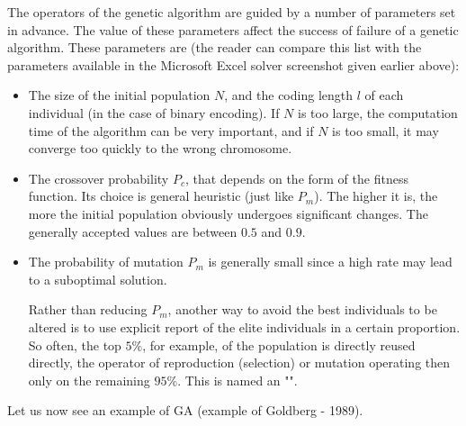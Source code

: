 	The operators of the genetic algorithm are guided by a number of parameters set in advance. The value of these parameters affect the success of failure of a genetic algorithm. These parameters are (the reader can compare this list with the parameters available in the Microsoft Excel solver screenshot given earlier above):
	\begin{itemize}
		\item The size of the initial population $N$, and the coding length $l$ of each individual (in the case of binary encoding). If $N$ is too large, the computation time of the algorithm can be very important, and if $N$ is too small, it may converge too quickly to the wrong chromosome.

		\item The crossover probability $P_c$, that depends on the form of the fitness function. Its choice is general heuristic (just like $P_m$). The higher it is, the more the initial population obviously undergoes significant changes. The generally accepted values are between $0.5$ and $0.9$.

		\item The probability of mutation $P_m$ is generally small since a high rate may lead to a suboptimal solution.
		
		Rather than reducing $P_m$, another way to avoid the best individuals to be altered is to use explicit report of the elite individuals in a certain proportion. So often, the top $5\%$, for example, of the population is directly reused directly, the operator of reproduction (selection) or mutation operating then only on the remaining $95\%$. This is named an "".
	\end{itemize}
	Let us now see an example of GA (example of Goldberg - 1989).
